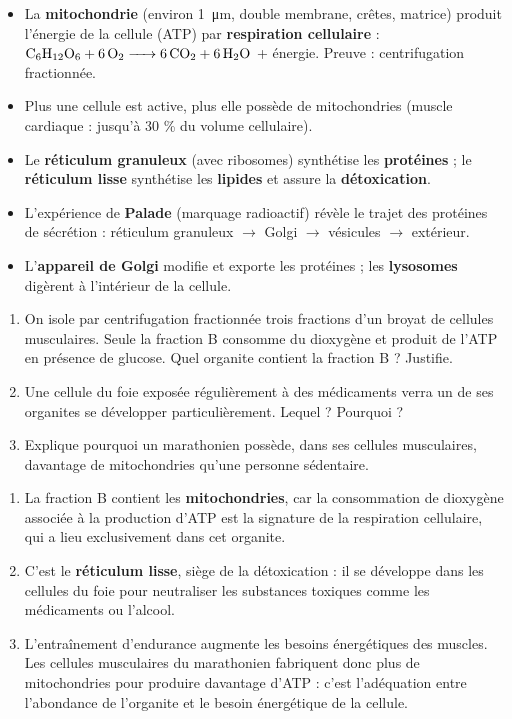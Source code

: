 \documentclass[11pt]{article}
\begin{document}
\begin{aretenir}
\begin{itemize}
\item La \textbf{mitochondrie} (environ \SI{1}{\micro\metre}, double membrane, crêtes, matrice) produit l'énergie de la cellule (ATP) par \textbf{respiration cellulaire} : $\ce{C6H12O6 + 6O2 -> 6CO2 + 6H2O}$ + énergie. Preuve : centrifugation fractionnée.
\item Plus une cellule est active, plus elle possède de mitochondries (muscle cardiaque : jusqu'à 30 \% du volume cellulaire).
\item Le \textbf{réticulum granuleux} (avec ribosomes) synthétise les \textbf{protéines} ; le \textbf{réticulum lisse} synthétise les \textbf{lipides} et assure la \textbf{détoxication}.
\item L'expérience de \textbf{Palade} (marquage radioactif) révèle le trajet des protéines de sécrétion : réticulum granuleux $\rightarrow$ Golgi $\rightarrow$ vésicules $\rightarrow$ extérieur.
\item L'\textbf{appareil de Golgi} modifie et exporte les protéines ; les \textbf{lysosomes} digèrent à l'intérieur de la cellule.
\end{itemize}
\end{aretenir}

\begin{exercice}
\begin{enumerate}
\item On isole par centrifugation fractionnée trois fractions d'un broyat de cellules musculaires. Seule la fraction B consomme du dioxygène et produit de l'ATP en présence de glucose. Quel organite contient la fraction B ? Justifie.
\item Une cellule du foie exposée régulièrement à des médicaments verra un de ses organites se développer particulièrement. Lequel ? Pourquoi ?
\item Explique pourquoi un marathonien possède, dans ses cellules musculaires, davantage de mitochondries qu'une personne sédentaire.
\end{enumerate}
\end{exercice}

\begin{corrige}
\begin{enumerate}
\item La fraction B contient les \textbf{mitochondries}, car la consommation de dioxygène associée à la production d'ATP est la signature de la respiration cellulaire, qui a lieu exclusivement dans cet organite.
\item C'est le \textbf{réticulum lisse}, siège de la détoxication : il se développe dans les cellules du foie pour neutraliser les substances toxiques comme les médicaments ou l'alcool.
\item L'entraînement d'endurance augmente les besoins énergétiques des muscles. Les cellules musculaires du marathonien fabriquent donc plus de mitochondries pour produire davantage d'ATP : c'est l'adéquation entre l'abondance de l'organite et le besoin énergétique de la cellule.
\end{enumerate}
\end{corrige}
\end{document}
